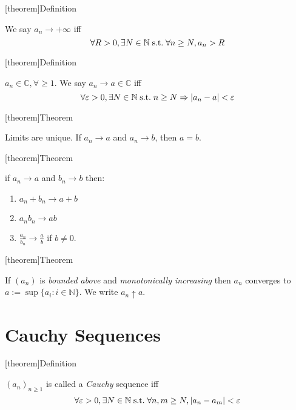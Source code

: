 \documentclass[12pt]{report}
\theoremstyle{definition}
\begin{document}
[theorem]{Definition}
\begin{approach to infinity}
    We say $a_n \rightarrow +\infty$ iff \[
        \forall R > 0, \exists N \in \mathbb{N} \;\textnormal{s.t.}\; \forall n \ge N, a_n > R
    \]
\end{approach to infinity}


[theorem]{Definition}
\begin{convergent complex sequence}
    $a_n \in \mathbb{C}, \forall \ge 1$. We say $a_n \rightarrow a \in \mathbb{C}$ iff \[
        \forall \varepsilon > 0, \exists N \in \mathbb{N} \;\textnormal{s.t.}\; n \ge N 
        \Rightarrow |a_n - a| < \varepsilon
    \]
\end{convergent complex sequence}

[theorem]{Theorem}
\begin{uniqueness of limits}
    Limits are unique. If $a_n \rightarrow a$ and $a_n \rightarrow b$, then $a = b$.
\end{uniqueness of limits}

[theorem]{Theorem}
\begin{algebra of limits}
    if $a_n \rightarrow a$ and $b_n \rightarrow b$ then:
    \begin{enumerate}
        \item $a_n + b_n \rightarrow a + b$
        \item $a_n b_n \rightarrow ab$
        \item $\frac{a_n}{b_n} \rightarrow \frac{a}{b}$ if $b \neq 0$.
    \end{enumerate}
\end{algebra of limits}

[theorem]{Theorem}
\begin{monotonically increasing to converge}
    If $(a_n)$ is \emph{bounded above} and \emph{monotonically increasing} then $a_n$ converges to
    $a := \sup{\{a_i : i \in \mathbb{N}\}}$. We write $a_n \uparrow a$.
\end{monotonically increasing to converge}

\section{Cauchy Sequences}
[theorem]{Definition}
\begin{cauchy sequences}
    ${(a_n)}_{n \ge 1}$ is called a \emph{Cauchy} sequence iff \[
        \forall \varepsilon > 0, \exists N \in \mathbb{N} \;\textnormal{s.t.}\; 
        \forall n,m \ge N, |a_n - a_m| < \varepsilon
    \]
\end{cauchy sequences}
\end{document}

